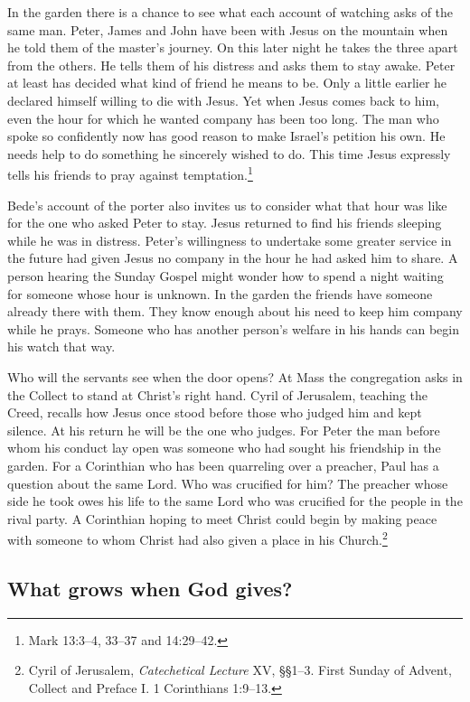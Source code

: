 In the garden there is a chance to see what each account of watching asks of the same man. Peter, James and John have been with Jesus on the mountain when he told them of the master's journey. On this later night he takes the three apart from the others. He tells them of his distress and asks them to stay awake. Peter at least has decided what kind of friend he means to be. Only a little earlier he declared himself willing to die with Jesus. Yet when Jesus comes back to him, even the hour for which he wanted company has been too long. The man who spoke so confidently now has good reason to make Israel's petition his own. He needs help to do something he sincerely wished to do. This time Jesus expressly tells his friends to pray against temptation.\footnote{Mark 13:3--4, 33--37 and 14:29--42.}

Bede's account of the porter also invites us to consider what that hour was like for the one who asked Peter to stay. Jesus returned to find his friends sleeping while he was in distress. Peter's willingness to undertake some greater service in the future had given Jesus no company in the hour he had asked him to share. A person hearing the Sunday Gospel might wonder how to spend a night waiting for someone whose hour is unknown. In the garden the friends have someone already there with them. They know enough about his need to keep him company while he prays. Someone who has another person's welfare in his hands can begin his watch that way.

Who will the servants see when the door opens? At Mass the congregation asks in the Collect to stand at Christ's right hand. Cyril of Jerusalem, teaching the Creed, recalls how Jesus once stood before those who judged him and kept silence. At his return he will be the one who judges. For Peter the man before whom his conduct lay open was someone who had sought his friendship in the garden. For a Corinthian who has been quarreling over a preacher, Paul has a question about the same Lord. Who was crucified for him? The preacher whose side he took owes his life to the same Lord who was crucified for the people in the rival party. A Corinthian hoping to meet Christ could begin by making peace with someone to whom Christ had also given a place in his Church.\footnote{Cyril of Jerusalem, \textit{Catechetical Lecture} XV, §§1--3. First Sunday of Advent, Collect and Preface I. 1 Corinthians 1:9--13.}

\subsection{What grows when God gives?}

